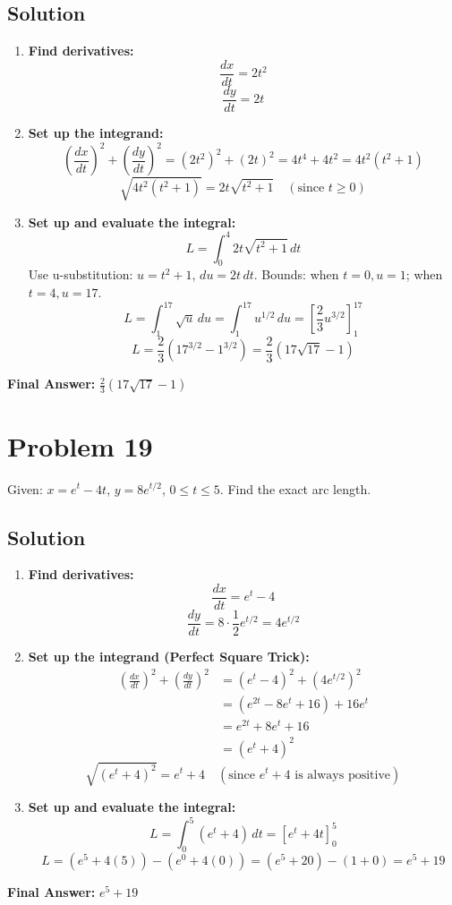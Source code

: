 \documentclass{article}
\begin{document}
\subsection*{Solution}
\begin{enumerate}
    \item \textbf{Find derivatives:}
    \[ \frac{dx}{dt} = 2t^2 \]
    \[ \frac{dy}{dt} = 2t \]
    \item \textbf{Set up the integrand:}
    \[ (\frac{dx}{dt})^2 + (\frac{dy}{dt})^2 = (2t^2)^2 + (2t)^2 = 4t^4 + 4t^2 = 4t^2(t^2+1) \]
    \[ \sqrt{4t^2(t^2+1)} = 2t\sqrt{t^2+1} \quad (\text{since } t \ge 0) \]
    \item \textbf{Set up and evaluate the integral:}
    \[ L = \int_{0}^{4} 2t\sqrt{t^2+1} \, dt \]
    Use u-substitution: $u = t^2+1$, $du = 2t \, dt$.
    Bounds: when $t=0, u=1$; when $t=4, u=17$.
    \[ L = \int_{1}^{17} \sqrt{u} \, du = \int_{1}^{17} u^{1/2} \, du = \left[ \frac{2}{3}u^{3/2} \right]_{1}^{17} \]
    \[ L = \frac{2}{3}(17^{3/2} - 1^{3/2}) = \frac{2}{3}(17\sqrt{17} - 1) \]
\end{enumerate}
\textbf{Final Answer:} $\frac{2}{3}(17\sqrt{17} - 1)$

\section{Problem 19}
Given: $x = e^t - 4t$, $y = 8e^{t/2}$, $0 \le t \le 5$. Find the exact arc length.

\subsection*{Solution}
\begin{enumerate}
    \item \textbf{Find derivatives:}
    \[ \frac{dx}{dt} = e^t - 4 \]
    \[ \frac{dy}{dt} = 8 \cdot \frac{1}{2} e^{t/2} = 4e^{t/2} \]
    \item \textbf{Set up the integrand (Perfect Square Trick):}
    \begin{align*}
    (\frac{dx}{dt})^2 + (\frac{dy}{dt})^2 &= (e^t - 4)^2 + (4e^{t/2})^2 \\
    &= (e^{2t} - 8e^t + 16) + 16e^t \\
    &= e^{2t} + 8e^t + 16 \\
    &= (e^t + 4)^2
    \end{align*}
    \[ \sqrt{(e^t + 4)^2} = e^t + 4 \quad (\text{since } e^t+4 \text{ is always positive}) \]
    \item \textbf{Set up and evaluate the integral:}
    \[ L = \int_{0}^{5} (e^t + 4) \, dt = \left[ e^t + 4t \right]_{0}^{5} \]
    \[ L = (e^5 + 4(5)) - (e^0 + 4(0)) = (e^5 + 20) - (1 + 0) = e^5 + 19 \]
\end{enumerate}
\textbf{Final Answer:} $e^5 + 19$
\end{document}
